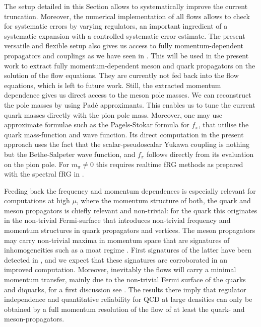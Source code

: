 \documentclass[aps,twocolumn,prd,superscriptaddress]{revtex4-2}
\begin{document}
The setup detailed in this Section allows to systematically improve the current truncation. Moreover, the numerical implementation of all flows allows to check for systematic errors by varying regulators, an important ingredient of a systematic expansion with a controlled systematic error estimate. The present versatile and flexible setup also gives us access to fully momentum-dependent propagators and couplings as we have seen in . This will be used in the present work to extract fully momentum-dependent meson and quark propagators on the solution of the flow equations. They are currently not fed back into the flow equations, which is left to future work. Still, the extracted momentum dependence gives us direct access to the meson pole masses. We can reconstruct the pole masses by using Pad\'e approximants. This enables us to tune the current quark masses directly with the pion pole mass. Moreover, one may use approximate formulae such as the Pagels-Stokar formula for $f_\pi$, that utilise the quark mass-function and wave function. Its direct computation in the present approach uses the fact that the scalar-pseudoscalar Yukawa coupling is nothing but the Bethe-Salpeter wave function, and $f_\pi$ follows directly from its evaluation on the pion pole. For $m_\pi\neq 0$ this requires realtime fRG methods as prepared with the spectral fRG in \cite{Horak:2020eng, Braun:2022mgx, Horak:2023hkp}. 

Feeding back the frequency and momentum dependences is especially relevant for computations at high $\mu$, where the momentum structure of both, the quark and meson propagators is chiefly relevant and non-trivial: for the quark this originates in the non-trivial Fermi-surface that introduces non-trivial frequency and momentum structures in quark propagators and vertices. The meson propagators may carry non-trivial maxima in momentum space that are signatures of inhomogeneities such as a moat regime \cite{Pisarski:2021qof, Rennecke:2023xhc}. First signatures of the latter have been detected in \cite{Fu:2019hdw}, and we expect that these signatures are corroborated in an improved computation. Moreover, inevitably the flows will carry a minimal momentum transfer, mainly due to the non-trivial Fermi surface of the quarks and diquarks, for a first discussion see \cite{Ihssen:2023xlp}. The results there imply that regulator independence and quantitative reliability for QCD at large densities can only be obtained by a full momentum resolution of the flow of at least the quark- and meson-propagators. 
\end{document}
